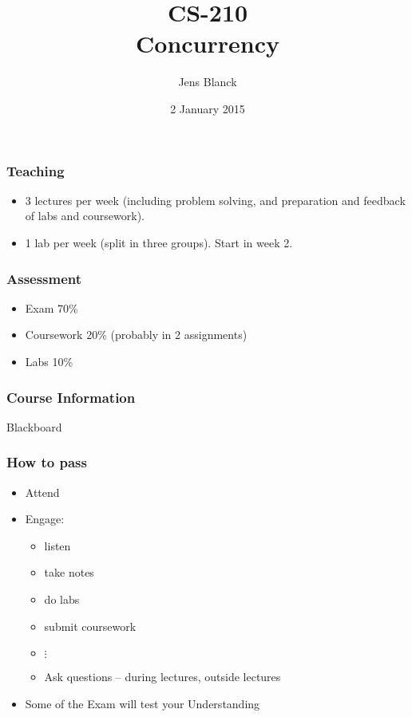 \documentclass{beamer}
\title{CS-210\\Concurrency}
\author{Jens Blanck}
\date{2 January 2015}
\begin{document}
\begin{frame}
  \titlepage
\end{frame}

\begin{frame}
  \frametitle{Teaching}
  \begin{itemize}
  \item 3 lectures per week (including problem solving, and preparation and
    feedback of labs and coursework).
  \item 1 lab per week (split in three groups). \alert{Start in week 2.}
  \end{itemize}
\end{frame}

\begin{frame}
  \frametitle{Assessment}
  \begin{itemize}
  \item Exam 70\%
  \item Coursework 20\% (probably in 2 assignments)
  \item Labs 10\%
  \end{itemize}
\end{frame}

\begin{frame}
  \frametitle{Course Information}
  \begin{center}
    \Huge Blackboard
  \end{center}
\end{frame}

\begin{frame}
  \frametitle{How to pass}
  \begin{itemize}
  \item Attend 
  \item Engage:
    \begin{itemize}
    \item listen
    \item take notes
    \item do labs
    \item submit coursework
    \item \(\vdots\)
    \item Ask questions -- during lectures, outside lectures
    \end{itemize}
  \item Some of the Exam will test your Understanding
  \end{itemize}
\end{frame}
\end{document}
